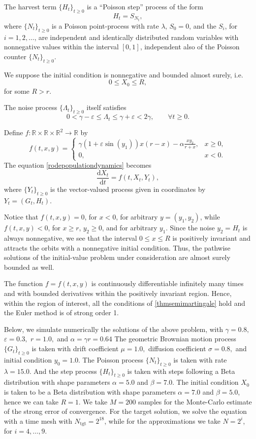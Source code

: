 \documentclass[reqno,12pt]{amsart}
\theoremstyle{plain} %
\theoremstyle{definition} %
\begin{document}
The harvest term $\{H_t\}_{t\geq 0}$ is a ``Poisson step'' process of the form
\[
    H_t = S_{N_t},
\]
where $\{N_t\}_{t\geq 0}$ is a Poisson point-process with rate $\lambda$, $S_0 = 0$, and the $S_i$, for $i=1, 2, \ldots$, are independent and identically distributed random variables with nonnegative values within the interval $[0, 1]$, independent also of the Poisson counter $\{N_t\}_{t\geq 0}$.

We suppose the initial condition is nonnegative and bounded almost surely, i.e.
\[
    0 \leq X_0 \leq R,
\]
for some $R > r$.

The noise process $\{\Lambda_t\}_{t \geq 0}$ itself satisfies
\[
    0 < \gamma - \varepsilon \leq \Lambda_t \leq \gamma + \varepsilon < 2\gamma, \qquad \forall t \geq 0.
\]

Define $f:\mathbb{R} \times \mathbb{R} \times \mathbb{R}^2 \rightarrow \mathbb{R}$ by
\[
    f(t, x, y) = \begin{cases}
        \displaystyle \gamma (1 + \varepsilon \sin(y_1)) x(r - x) - \alpha \frac{xy_2}{r + x}, & x \geq 0, \\
        0, & x < 0.
    \end{cases}
\]
The equation \eqref{rodepopulationdynamics} becomes
\[
    \frac{\mathrm{d}X_t}{\mathrm{d}t} = f(t, X_t, Y_t),
\]
where $\{Y_t\}_{t\geq 0}$ is the vector-valued process given in coordinates by $Y_t = (G_t, H_t)$.

Notice that $f(t, x, y) = 0$, for $x < 0$, for arbitrary $y=(y_1, y_2)$, while $f(t, x, y) < 0$, for $x \geq r$, $y_2 \geq 0$, and for arbitrary $y_1$. Since the noise $y_2 = H_t$ is always nonnegative, we see that the interval $0 \leq x \leq R$ is positively invariant and attracts the orbits with a nonnegative initial condition. Thus, the pathwise solutions of the initial-value problem under consideration are almost surely bounded as well.

The function $f=f(t, x, y)$ is continuously differentiable infinitely many times and with bounded derivatives within the positively invariant region. Hence, within the region of interest, all the conditions of \cref{thmsemimartingale} hold and the Euler method is of strong order 1.

Below, we simulate numerically the solutions of the above problem, with $\gamma = 0.8,$ $\varepsilon = 0.3,$ $r = 1.0,$ and $\alpha = \gamma r = 0.64$ The geometric Brownian motion process $\{G_t\}_{t\geq 0}$ is taken with drift coefficient $\mu = 1.0,$ diffusion coefficient $\sigma = 0.8,$ and initial condition $y_0 = 1.0.$ The Poisson process $\{N_t\}_{t \geq 0}$ is taken with rate $\lambda = 15.0$. And the step process $\{H_t\}_{t \geq 0}$ is taken with steps following a Beta distribution with shape parameters $\alpha = 5.0$ and $\beta = 7.0$. The initial condition $X_0$ is taken to be a Beta distribution with shape parameters $\alpha = 7.0$ and $\beta = 5.0$, hence we can take $R = 1$. We take $M = 200$ samples for the Monte-Carlo estimate of the strong error of convergence. For the target solution, we solve the equation with a time mesh with $N_{\mathrm{tgt}} = 2^{18}$, while for the approximations we take $N = 2^i$, for $i=4, \ldots, 9$.
\end{document}
